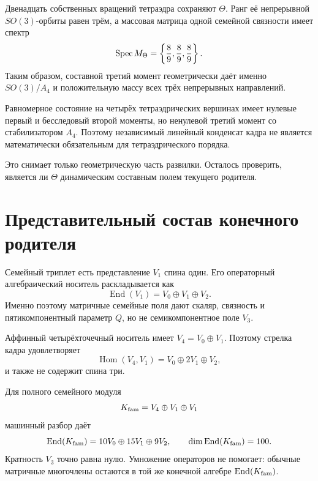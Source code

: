 Двенадцать собственных вращений тетраэдра сохраняют $\Theta$. Ранг её
непрерывной $SO(3)$-орбиты равен трём, а массовая матрица одной семейной
связности имеет спектр
\begin{equation}
 \operatorname{Spec} M_\Theta=\left\{\frac89,\frac89,\frac89\right\}.
 \label{eq:v6-composite-third-moment-gauge-mass}
\end{equation}
Таким образом, составной третий момент геометрически даёт именно
$SO(3)/A_4$ и положительную массу всех трёх непрерывных направлений.

\begin{proposition}
Равномерное состояние на четырёх тетраэдрических вершинах имеет нулевые
первый и бесследовый второй моменты, но ненулевой третий момент со
стабилизатором $A_4$. Поэтому независимый линейный конденсат кадра не
является математически обязательным для тетраэдрического порядка.
\end{proposition}

Это снимает только геометрическую часть развилки. Осталось проверить,
является ли $\Theta$ динамическим составным полем текущего родителя.

\section{Представительный состав конечного родителя}

Семейный триплет есть представление $V_1$ спина один. Его операторный
алгебраический носитель раскладывается как
\begin{equation}
 \operatorname{End}(V_1)=V_0\oplus V_1\oplus V_2.
 \label{eq:v6-end-triplet-spin-bound}
\end{equation}
Именно поэтому матричные семейные поля дают скаляр, связность и
пятикомпонентный параметр $Q$, но не семикомпонентное поле $V_3$.

Аффинный четырёхточечный носитель имеет
$V_4=V_0\oplus V_1$. Поэтому стрелка кадра удовлетворяет
\begin{equation}
 \operatorname{Hom}(V_4,V_1)
 =V_0\oplus2V_1\oplus V_2,
 \label{eq:v6-frame-arrow-decomposition}
\end{equation}
и также не содержит спина три.

Для полного семейного модуля
\begin{equation}
 K_{\rm fam}=V_4\oplus V_1\oplus V_1
\end{equation}
машинный разбор даёт
\begin{equation}
 \operatorname{End}(K_{\rm fam})
 =10V_0\oplus15V_1\oplus9V_2,
 \qquad \dim\operatorname{End}(K_{\rm fam})=100.
 \label{eq:v6-full-parent-spin-ledger}
\end{equation}
Кратность $V_3$ точно равна нулю. Умножение операторов не помогает:
обычные матричные многочлены остаются в той же конечной алгебре
$\operatorname{End}(K_{\rm fam})$.

